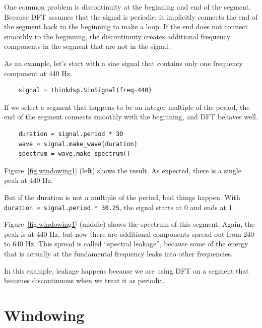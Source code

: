 \documentclass[12pt]{book}
\begin{document}
One common problem is discontinuity at the beginning and end of the
segment.  Because DFT assumes that the signal is periodic, it
implicitly connects the end of the segment back to the beginning to
make a loop.  If the end does not connect smoothly to the beginning,
the discontinuity creates additional frequency components in the
segment that are not in the signal.

As an example, let's start with a sine signal that contains only
one frequency component at 440 Hz.

\begin{verbatim}
    signal = thinkdsp.SinSignal(freq=440)
\end{verbatim}

If we select a segment that happens to be an integer multiple of
the period, the end of the segment connects smoothly with the
beginning, and DFT behaves well.

\begin{verbatim}
    duration = signal.period * 30
    wave = signal.make_wave(duration)
    spectrum = wave.make_spectrum()
\end{verbatim}

Figure~\ref{fig.windowing1} (left) shows the result.  As expected,
there is a single peak at 440 Hz.

But if the duration is not a multiple of the period, bad things
happen.  With {\tt duration = signal.period * 30.25}, the signal
starts at 0 and ends at 1.

Figure~\ref{fig.windowing1} (middle) shows
the spectrum of this segment.  Again, the peak is at 440 Hz, but now
there are additional components spread out from 240 to 640 Hz.  This
spread is called ``spectral leakage'', because some of the energy that
is actually at the fundamental frequency leaks into other frequencies.

In this example, leakage happens because we are using DFT on a segment
that becomes discontinuous when we treat it as periodic.


\section{Windowing}
\end{document}
